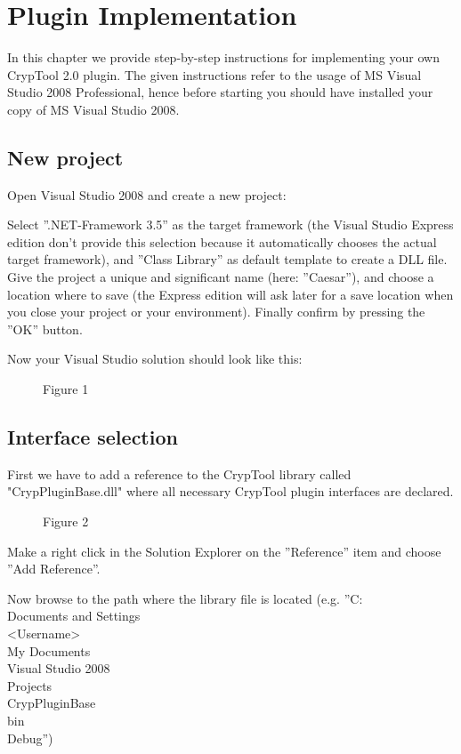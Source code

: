 \chapter{Plugin Implementation}
In this chapter we provide step-by-step instructions for implementing your own CrypTool 2.0 plugin. The given instructions refer to the usage of MS Visual Studio 2008 Professional, hence before starting you should have installed your copy of MS Visual Studio 2008.



\section{New project}
\label{sec:CreateANewProjectInVS2008ForYourPlugin}
Open Visual Studio 2008 and create a new project:

Select ''.NET-Framework 3.5'' as the target framework (the Visual Studio Express edition don't provide this selection because it automatically chooses the actual target framework), and ''Class Library'' as default template to create a DLL file. Give the project a unique and significant name (here: ''Caesar''), and choose a location where to save (the Express edition will ask later for a save location when you close your project or your environment).  Finally confirm by pressing the ''OK'' button.

Now your Visual Studio solution should look like this:


\begin{figure}
    \caption{Figure 1}\label{fig:figure1}
\end{figure}


\section{Interface selection}
\label{sec:SelectTheInterfaceYourPluginWantsToServe}
First we have to add a reference to the CrypTool library called "CrypPluginBase.dll" where all necessary CrypTool plugin interfaces are declared.

\begin{figure}
    \caption{Figure 2}\label{fig:figure2}
\end{figure}

Make a right click in the Solution Explorer on the ''Reference'' item and choose ''Add Reference''.

Now browse to the path where the library file is located (e.g. ''C:\\Documents and Settings\\<Username>\\My Documents\\Visual Studio 2008\\Projects\\CrypPluginBase\\bin\\Debug'')

